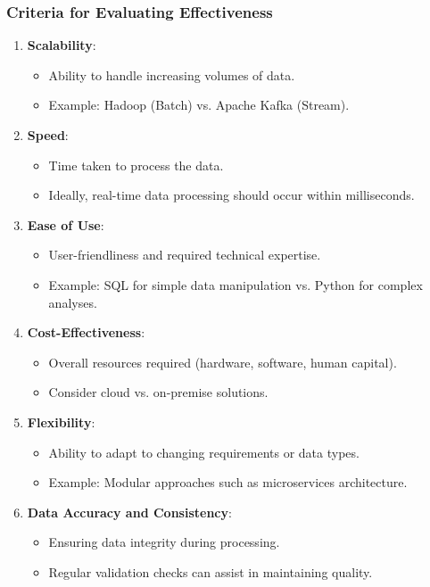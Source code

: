 \documentclass[aspectratio=169]{beamer}
\begin{document}
\begin{frame}[fragile]
    \frametitle{Criteria for Evaluating Effectiveness}
    \begin{enumerate}
        \item \textbf{Scalability}:
            \begin{itemize}
                \item Ability to handle increasing volumes of data.
                \item Example: Hadoop (Batch) vs. Apache Kafka (Stream).
            \end{itemize}
        
        \item \textbf{Speed}:
            \begin{itemize}
                \item Time taken to process the data.
                \item Ideally, real-time data processing should occur within milliseconds.
            \end{itemize}
        
        \item \textbf{Ease of Use}:
            \begin{itemize}
                \item User-friendliness and required technical expertise.
                \item Example: SQL for simple data manipulation vs. Python for complex analyses.
            \end{itemize}
        
        \item \textbf{Cost-Effectiveness}:
            \begin{itemize}
                \item Overall resources required (hardware, software, human capital).
                \item Consider cloud vs. on-premise solutions.
            \end{itemize}
        
        \item \textbf{Flexibility}:
            \begin{itemize}
                \item Ability to adapt to changing requirements or data types.
                \item Example: Modular approaches such as microservices architecture.
            \end{itemize}
        
        \item \textbf{Data Accuracy and Consistency}:
            \begin{itemize}
                \item Ensuring data integrity during processing.
                \item Regular validation checks can assist in maintaining quality.
            \end{itemize}
    \end{enumerate}
\end{frame}
\end{document}
